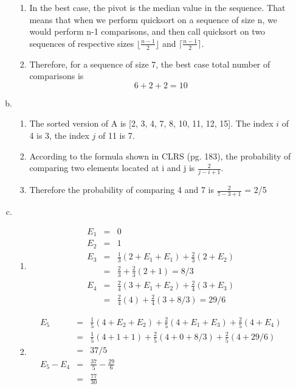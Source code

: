\documentclass[11pt]{article}
\begin{document}
\begin{enumerate}
\begin{enumerate}[a)]
					\begin{enumerate}[$\circ$]
						\item In the best case, the pivot is the median value in the sequence. That means that when we perform quicksort on a sequence of size n, we would perform n-1 comparisons,
and then call quicksort on two sequences of respective sizes $\lfloor \frac{n-1}{2} \rfloor$ and $\lceil \frac{n-1}{2} \rceil$.
						\item Therefore, for a sequence of size 7, the best case total number of comparisons is
$$6 + 2 + 2 = 10$$
					\end{enumerate}
				\item %
					\begin{enumerate}[$\circ$]
						\item The sorted version of A is [2, 3, 4, 7, 8, 10, 11, 12, 15]. The index $i$ of 4 is 3, the index $j$ of 11 is 7. 

						\item According to the formula shown in CLRS (pg. 183), the probability of comparing two elements located at i and j is $\frac{2}{j-i + 1}$. 

						\item Therefore the probability of comparing 4 and 7 is  $\frac{2}{7 - 3 + 1}$ = 2/5			
					\end{enumerate}
				
				\item %
					\begin{enumerate}
						\item
							\begin{eqnarray*}
								E_1 & = & 0 \\
								E_2 & = & 1 \\
								E_3 & = & \frac{1}{3} (2 + E_1 + E_1) + \frac{2}{3} (2 + E_2) \\
								& = &\frac{2}{3} + \frac{2}{3} (2 + 1) = 8/3 \\
								E_4 & = & \frac{2}{4} (3 + E_1 + E_2) + \frac{2}{4} (3 + E_3) \\
								& = & \frac{2}{4} (4) + \frac{2}{4} (3 + 8/3) = 29/6 
							\end{eqnarray*}
						\item 
							\begin{eqnarray*}
								E_5 & = & \frac{1}{5} (4 + E_2 + E_2) + \frac{2}{5} (4 + E_1 + E_3) +\frac{2}{5} (4 + E_4) \\
		  						& = & \frac{1}{5} (4 + 1 + 1) + \frac{2}{5} (4 + 0 + 8/3) + \frac{2}{5} (4 + 29/6) \\
		  						& = & 37/5 \\
		  						E_5 - E_4 & = & \frac{37}{5} - \frac{29}{6} \\
		  						& = & \frac{77}{30} \\
							\end{eqnarray*}
							

\end{enumerate}
\end{enumerate}
\end{enumerate}
\end{document}
